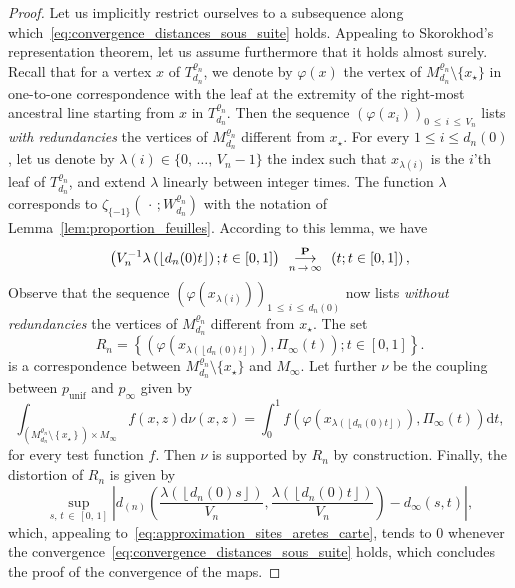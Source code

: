 \documentclass[10pt]{amsart}
\theoremstyle{definition}\newtheorem{defi}[theo]{Definition}\newtheorem{rema}[theo]{Remark}\newtheorem{exam}[theo]{Example}\newtheorem{exem}[theo]{Example}\newtheorem{nota}[theo]{Notation}
\newcommand{\ensembles}[1]{\mathbf{#1}}
\renewcommand{\P}{\ensembles{P}}
\newcommand{\1}{\ensembles{1}}
\renewcommand{\le}{\leqslant}
\newcommand{\Rmap}{R}
\renewcommand{\d}{\mathrm{d}}
\newcommand{\mn}{M_{d_n}^{\varrho_n}}
\newcommand{\pgr}{p_{\mathrm{unif}}}
\newcommand{\fn}{T_{d_n}^{\varrho_n}}
\newcommand{\Wfn}{W_{d_n}^{\varrho_n}}
\newcommand{\vertices}{V}
\newcommand{\cvproba}[1][n]{\enskip\mathop{\longrightarrow}^{\P}_{#1\,\to\, \infty}\enskip}
\providecommand{\?}{}
\begin{document}
\begin{proof}
Let us implicitly restrict ourselves to a subsequence along which~\eqref{eq:convergence_distances_sous_suite} holds. Appealing to Skorokhod's representation theorem, let us assume furthermore that it holds almost surely. Recall that for a vertex $x$ of $\fn$, we denote by $\varphi(x)$ the vertex of $\mn\setminus\{x_\star\}$ in one-to-one correspondence with the leaf at the extremity of the right-most ancestral line starting from $x$ in $\fn$. Then the sequence $(\varphi(x_i))_{0\,\le\,i\,\le\, \vertices_n}$ lists \emph{with redundancies} the vertices of $\mn$ different from $x_\star$. For every $1 \le i \le d_n(0)$, let us denote by $\lambda(i) \in \{0, \,\dots,\,\vertices_n-1\}$ the index such that $x_{\lambda(i)}$ is the $i$'th leaf of $\fn$, and extend $\lambda$ linearly between integer times. The function $\lambda$ corresponds to $\zeta_{\{-1\}}(\,\cdot\,; \Wfn)$ with the notation of Lemma~\ref{lem:proportion_feuilles}. According to this lemma, we have
\begin{equation}\label{eq:approximation_sites_aretes_carte}
\left(\vertices_n^{-1} \lambda\left(\left\lfloor d_n(0) t\right\rfloor\right) ; t \in [0,1]\right) \cvproba \left(t ; t \in [0,1]\right),
\end{equation}
Observe that the sequence $(\varphi(x_{\lambda(i)}))_{1\,\le\,i\,\le\,d_n(0)}$ now lists \emph{without redundancies} the vertices of $\mn$ different from $x_\star$. The set
\[
\Rmap_n = \left\{\left(\varphi\left(x_{\lambda\left(\left\lfloor d_n(0) t\right\rfloor\right)}\right), \Pi_\infty(t)\right) ; t \in [0,1]\right\}.
\]
is a correspondence between $\mn\setminus\{x_\star\}$ and $M_\infty$. Let further $\nu$ be the coupling between $\pgr$ and $p_\infty$ given by
\[
\int_{\left(\mn\setminus\left\{x_\star\right\}\right) \times M_\infty} f(x, z) \d\nu(x, z) = \int_0^1 f\left(\varphi\left(x_{\lambda\left(\left\lfloor d_n(0) t\right\rfloor\right)}\right), \Pi_\infty(t)\right) \d t,
\]
for every test function $f$. Then $\nu$ is supported by $\Rmap_n$ by construction. Finally, the distortion of $\Rmap_n$ is given by
\[
\sup_{s,\,t\,\in\,[0,\,1]} \left|d_{(n)}\left(\frac{\lambda\left(\left\lfloor d_n(0) s\right\rfloor\right)}{\vertices_n}, \frac{\lambda\left(\left\lfloor d_n(0) t\right\rfloor\right)}{\vertices_n}\right) - d_\infty(s,t)\right|,
\]
which, appealing to~\eqref{eq:approximation_sites_aretes_carte}, tends to $0$ whenever the convergence~\eqref{eq:convergence_distances_sous_suite} holds, which concludes the proof of the convergence of the maps.


\end{proof}
\end{document}
